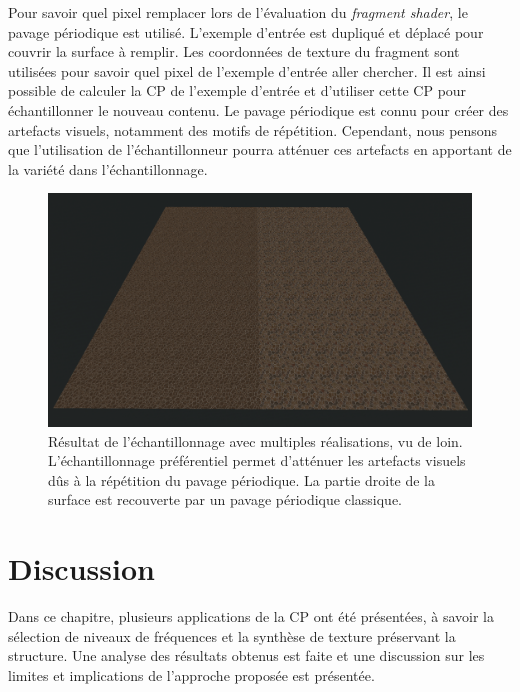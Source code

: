 Pour savoir quel pixel remplacer lors de l'évaluation du \textit{fragment shader}, le pavage périodique est utilisé. L'exemple d'entrée est dupliqué et déplacé pour couvrir la surface à remplir. Les coordonnées de texture du fragment sont utilisées pour savoir quel pixel de l'exemple d'entrée aller chercher. Il est ainsi possible de calculer la CP de l'exemple d'entrée et d'utiliser cette CP pour échantillonner le nouveau contenu. Le pavage périodique est connu pour créer des artefacts visuels, notamment des motifs de répétition. Cependant, nous pensons que l'utilisation de l'échantillonneur pourra atténuer ces artefacts en apportant de la variété dans l'échantillonnage.

\begin{figure}[t]
    \centering
    \includegraphics[width=\textwidth]{contenu/resources/images/partitioned_sampling_pc_preserving_shuffle_uv_far}
    \caption[Résultat de l'échantillonnage avec multiples réalisations, vu de loin]{Résultat de l'échantillonnage avec multiples réalisations, vu de loin. L'échantillonnage préférentiel permet d'atténuer les artefacts visuels dûs à la répétition du pavage périodique. La partie droite de la surface est recouverte par un pavage périodique classique.}
    \label{fig:pc-preserving-synthesis}
\end{figure}

\section{Discussion}

Dans ce chapitre, plusieurs applications de la CP ont été présentées, à savoir la sélection de niveaux de fréquences et la synthèse de texture préservant la structure. Une analyse des résultats obtenus est faite et une discussion sur les limites et implications de l'approche proposée est présentée.

